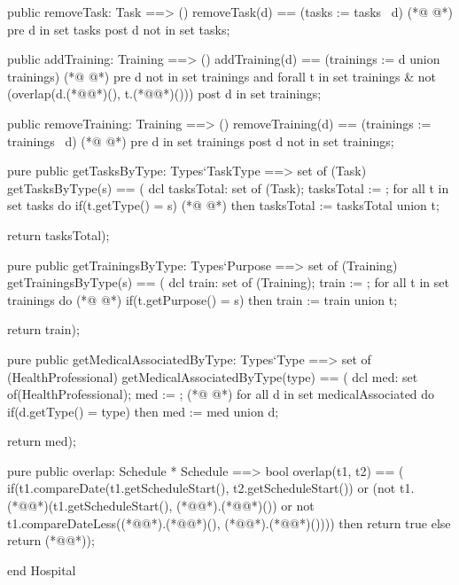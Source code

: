 \begin{vdmpp}[breaklines=true]
 public removeTask: Task ==> ()
  removeTask(d) == (tasks := tasks \ {d})
(*@
\label{addTraining:57}
@*)
 pre d in set tasks
 post d not in set tasks;
 
 public addTraining: Training ==> ()
  addTraining(d) == (trainings := {d} union trainings)
(*@
\label{removeTraining:62}
@*)
 pre d not in set trainings and forall t in set trainings & not (overlap(d.(*@@*)(), t.(*@@*)()))
 post d in set trainings;
  
 public removeTraining: Training ==> ()
  removeTraining(d) == (trainings := trainings \ {d})
(*@
\label{getTasksByType:67}
@*)
 pre d in set trainings
 post d not in set trainings;
 
 pure public getTasksByType: Types`TaskType ==> set of (Task)
  getTasksByType(s) == (
              dcl tasksTotal: set of (Task);
              tasksTotal := {};
              for all t in set tasks do
               if(t.getType() = s)
(*@
\label{getTrainingsByType:76}
@*)
                then tasksTotal := tasksTotal union {t};
                
              return tasksTotal);
              
 pure public getTrainingsByType: Types`Purpose ==> set of (Training)
  getTrainingsByType(s) == (
              dcl train: set of (Training);
              train := {};
              for all t in set trainings do
(*@
\label{getMedicalAssociatedByType:85}
@*)
               if(t.getPurpose() = s)
                then train := train union {t};
                
              return train);

 pure public getMedicalAssociatedByType: Types`Type ==> set of (HealthProfessional)
  getMedicalAssociatedByType(type) == (
           dcl med: set of(HealthProfessional);
           med := {};
(*@
\label{overlap:94}
@*)
           for all d in set medicalAssociated do
            if(d.getType() = type)
             then med := med union {d};
            
           return med);
           
 pure public overlap: Schedule * Schedule ==> bool
  overlap(t1, t2) == (
             if(t1.compareDate(t1.getScheduleStart(), t2.getScheduleStart()) 
              or (not t1.(*@@*)(t1.getScheduleStart(), (*@@*).(*@@*)()) 
              or not t1.compareDateLess((*@@*).(*@@*)(), (*@@*).(*@@*)())))
              then return true
             else
              return (*@@*));
              
end Hospital
\end{vdmpp}
